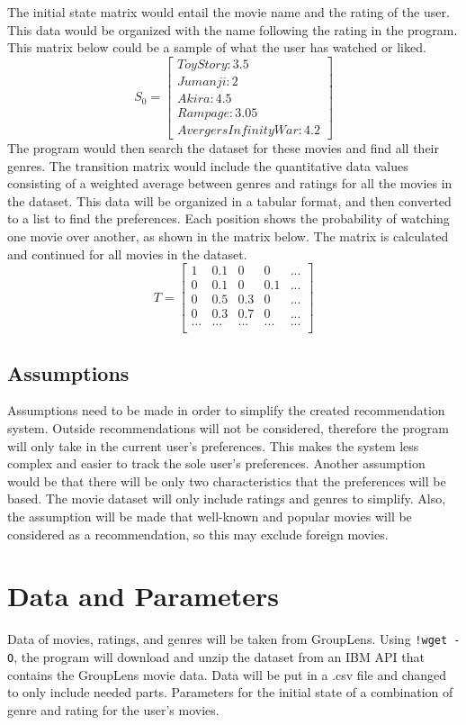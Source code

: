 \documentclass{article}
\begin{document}
The initial state matrix would entail the movie name and the rating of the user. This data would be organized with the name following 
the rating in the program. This matrix below could be a sample
of what the user has watched or liked.
$$
S_0 =
\begin{bmatrix}
Toy Story:3.5 \\
Jumanji:2 \\
Akira:4.5 \\
Rampage:3.05 \\
Avergers Infinity War: 4.2
\end{bmatrix}
$$
    The program would then search the dataset for these movies and find all their genres. The transition matrix would include the 
quantitative data values consisting of a weighted average between genres and ratings for all the movies in the dataset. This data will be 
organized in a tabular format, and then converted to a list to find the preferences. Each position shows the probability of watching one 
movie over another, as shown in the matrix below. The matrix is calculated and continued for all movies in the dataset.
$$
T =
\begin{bmatrix}
1 & 0.1 & 0 & 0 & ...\\
0 & 0.1 & 0 & 0.1 & ...\\
0 & 0.5 & 0.3 & 0 & ...\\
0 & 0.3 & 0.7 & 0 & ...\\
... & ... & ... & ... & ...\\
\end{bmatrix}
$$ 

\subsection{Assumptions}
Assumptions need to be made in order to simplify the created recommendation system. Outside recommendations will not be considered, therefore the program will only take in 
the current user's preferences. This makes the system less complex and easier to track the sole user's preferences. 
Another assumption would be that there will be only two characteristics that the preferences will be based. The movie dataset will only include ratings and 
genres to simplify. Also, the assumption will be made that well-known and popular movies will be considered as a recommendation, so this may exclude foreign movies.


\section{Data and Parameters}
Data of movies, ratings, and genres will be taken from GroupLens. Using \verb|!wget -O|, the program will download and unzip the dataset from an IBM API that contains the GroupLens
movie data. Data will be put in a .csv file and changed to only include needed parts. Parameters for the initial state of a combination of genre and rating for the user's movies.


\end{document}
